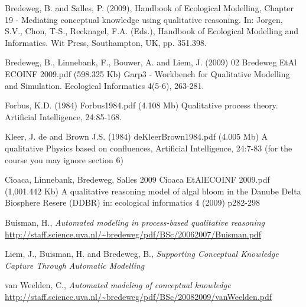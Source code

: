 \documentclass{article}
\begin{document}
\begin{thebibliography}{99}


 Bredeweg, B. and Salles, P. (2009), Handbook of
Ecological Modelling, Chapter 19 - Mediating conceptual knowledge using
qualitative reasoning. In: J\/orgen, S.V., Chon, T-S., Recknagel, F.A. (Eds.),
Handbook of Ecological Modelling and Informatics. Wit Press, Southampton, UK,
pp. 351.398.

 Bredeweg, B., Linnebank, F., Bouwer, A. and Liem, J.
(2009) 02 Bredeweg EtAl ECOINF 2009.pdf (598.325 Kb) Garp3 - Workbench for
Qualitative Modelling and Simulation. Ecological Informatics 4(5-6), 263-281.

 Forbus, K.D. (1984) Forbus1984.pdf (4.108 Mb) Qualitative
process theory. Artificial Intelligence, 24:85-168. 

 Kleer, J. de and Brown J.S. (1984) deKleerBrown1984.pdf (4.005
Mb) A qualitative Physics based on confluences, Artificial Intelligence,
24:7-83 (for the course you may ignore section 6)

 Cioaca, Linnebank, Bredeweg, Salles 2009 Cioaca EtAlECOINF
2009.pdf (1,001.442 Kb) A qualitative reasoning model of algal bloom in the
Danube Delta Biosphere Resere (DDBR) in: ecological informatics 4 (2009)
p282-298

 Buisman, H., \emph{Automated modeling in process-based
qualitative reasoning}
\url{http://staff.science.uva.nl/~bredeweg/pdf/BSc/20062007/Buisman.pdf}

 Liem, J., Buisman, H. and Bredeweg, B., \emph{Supporting
Conceptual Knowledge Capture Through Automatic Modelling}

 van Weelden, C., \emph{Automated modeling of conceptual
knowledge}
\url{http://staff.science.uva.nl/~bredeweg/pdf/BSc/20082009/vanWeelden.pdf}

\end{thebibliography}
\end{document}
